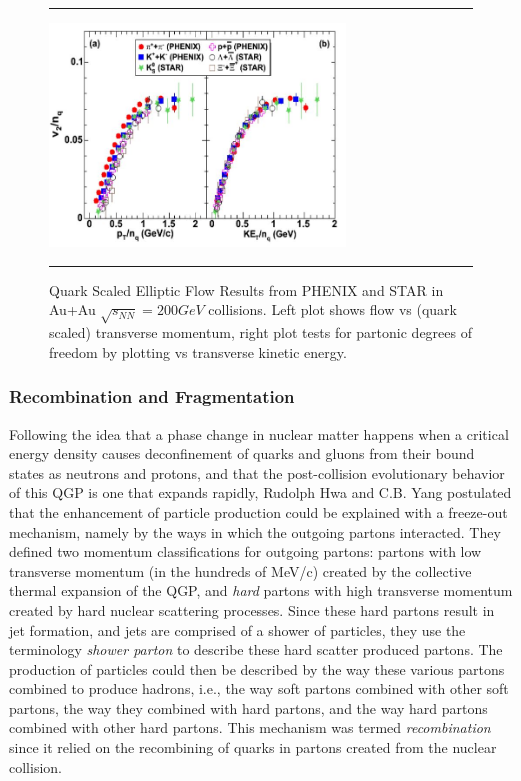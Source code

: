 \begin{figure}[htbp!]
  \centering    \rule{35em}{0.5pt}
    \includegraphics[width=0.7\textwidth]{prevplots/quarkscaledv2.JPG}

  \caption[Quark Scaled Elliptic Flow Results from PHENIX and STAR in Au+Au $\sqrt{s_NN}=200 GeV$ collisions]{Quark Scaled Elliptic Flow Results from PHENIX and STAR\citep{velkovska:lec12} in Au+Au $\sqrt{s_{NN}}=200 GeV$ collisions. Left plot shows flow vs (quark scaled) transverse momentum, right plot tests for partonic degrees of freedom by plotting vs transverse kinetic energy.}
  \label{fig:quarkscaledv2}    \rule{35em}{0.5pt}
\end{figure} 

\subsubsection{Recombination and Fragmentation}
Following the idea that a phase change in nuclear matter happens when a critical energy density causes deconfinement of quarks and gluons from their bound states as neutrons and protons, and that the post-collision evolutionary behavior of this QGP is one that expands rapidly, Rudolph Hwa and C.B. Yang postulated that the enhancement of particle production could be explained with a freeze-out mechanism, namely by the ways in which the outgoing partons interacted\citep{PhysRevC.70.024905}. They defined two momentum classifications for outgoing partons:  partons with low transverse momentum (in the hundreds of MeV/c) created by the collective thermal expansion of the QGP, and \textit{hard} partons with high transverse momentum created by hard nuclear scattering processes. Since these hard partons result in jet formation, and jets are comprised of a shower of particles, they use the terminology \textit{shower parton} to describe these hard scatter produced partons. The production of particles could then be described by the way these various partons combined to produce hadrons, i.e., the way soft partons combined with other soft partons, the way they combined with hard partons, and the way hard partons combined with other hard partons. This mechanism was termed \textit{recombination} since it relied on the recombining of quarks in partons created from the nuclear collision.

